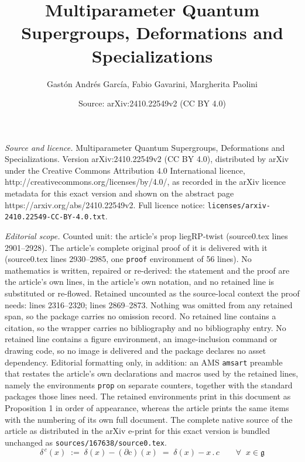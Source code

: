 \documentclass[10pt,a4paper]{amsart}
\title{Multiparameter Quantum Supergroups, Deformations and Specializations}
\author{Gast\'on Andr\'es Garc\'ia, Fabio Gavarini, Margherita Paolini}
\date{Source: arXiv:2410.22549v2 (CC BY 4.0)}
\def \lieg{\mathfrak{g}}
\begin{document}
\maketitle

\noindent\emph{Source and licence.} Multiparameter Quantum Supergroups, Deformations and Specializations. Version arXiv:2410.22549v2 (CC BY 4.0), distributed by arXiv under the Creative Commons Attribution 4.0 International licence, http://creativecommons.org/licenses/by/4.0/, as recorded in the arXiv licence metadata for this exact version and shown on the abstract page https://arxiv.org/abs/2410.22549v2. Full licence notice: \texttt{licenses/arxiv-2410.22549-CC-BY-4.0.txt}.\par\smallskip

\noindent\textit{Editorial scope.} Counted unit: the article's prop liegRP-twist (source0.tex lines 2901--2928). The article's complete original proof of it is delivered with it (source0.tex lines 2930--2985, one \texttt{proof} environment of 56 lines). No mathematics is written, repaired or re-derived: the statement and the proof are the article's own lines, in the article's own notation, and no retained line is substituted or re-flowed.  Retained uncounted as the source-local context the proof needs: lines 2316--2320; lines 2869--2873.  Nothing was omitted from any retained span, so the package carries no omission record.  No retained line contains a citation, so the wrapper carries no bibliography and no bibliography entry.  No retained line contains a figure environment, an image-inclusion command or drawing code, so no image is delivered and the package declares no asset dependency.  Editorial formatting only, in addition: an AMS \texttt{amsart} preamble that restates the article's own declarations and macros used by the retained lines, namely the environments \texttt{prop} on separate counters, together with the standard packages those lines need.  The retained environments print in this document as Proposition 1 in order of appearance, whereas the article prints the same items with the numbering of its own full document.  The complete native source of the article as distributed in the arXiv e-print for this exact version is bundled unchanged as \texttt{sources/167638/source0.tex}.
\begin{equation}  \label{eq: def_twist-delta}
%
  \delta^{\,c}(x)  \; := \;  \delta(x) - (\partial c)(x)  \; = \;  \delta(x) - x\,.\,c   \qquad  \forall \;\; x \in \lieg
%
\end{equation}
\end{document}
